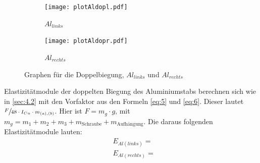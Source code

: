 \begin{figure}[H]
\begin{subfigure}{0.495\linewidth}
    \centering
    \texttt{[image: plotAldopl.pdf]}
    \caption{$Al_{links}$\label{fig:4a}}
\end{subfigure}
\begin{subfigure}{0.495\linewidth}
    \centering
    \texttt{[image: plotAldopr.pdf]}
    \caption{$Al_{rechts}$\label{fig:4b}}    
\end{subfigure}
\caption{Graphen für die Doppelbiegung, $Al_{links}$ und $Al_{rechts}$\label{fig:4}}
\end{figure}

\justifying Elastizitätmodule der doppelten Biegung des Aluminiumstabs berechnen sich wie in \ref{sec:4.2} mit den Vorfaktor
aus den Formeln \eqref{eq:5} und \eqref{eq:6}. Dieser lautet $\sfrac{F}{48 \cdot I_{Cu} \cdot m_{(a),(b)}}$. Hier ist $F = m_g\cdot g$, mit 
$m_g = m_1 + m_2 + m_3 + m_{\text{Schraube}} + m_{\text{Aufhängung}}$. Die daraus folgenden Elastizitätmodule lauten:
\begin{align}
    &E_{Al(links)} = \text{} \label{eq:28}\\
    &E_{Al(rechts)} = \text{} \label{eq:29}
\end{align}



